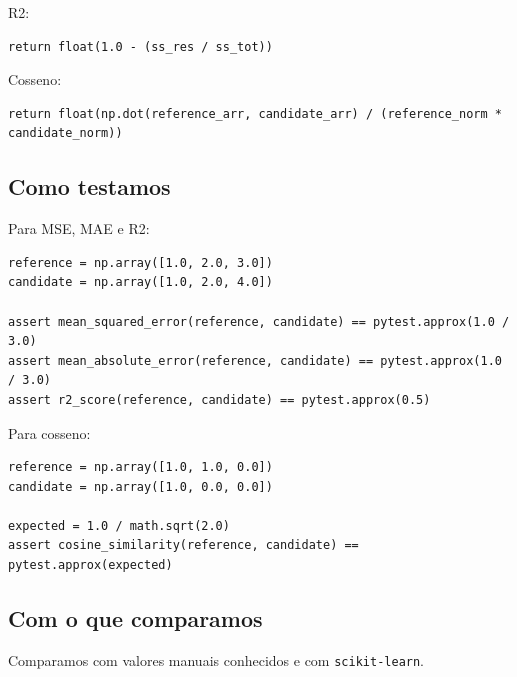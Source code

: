 R2:



\begin{Verbatim}[fontsize=\small,breaklines=true,label=python]
return float(1.0 - (ss_res / ss_tot))
\end{Verbatim}



Cosseno:



\begin{Verbatim}[fontsize=\small,breaklines=true,label=python]
return float(np.dot(reference_arr, candidate_arr) / (reference_norm * candidate_norm))
\end{Verbatim}



\subsection{Como testamos}



Para MSE, MAE e R2:



\begin{Verbatim}[fontsize=\small,breaklines=true,label=python]
reference = np.array([1.0, 2.0, 3.0])
candidate = np.array([1.0, 2.0, 4.0])

assert mean_squared_error(reference, candidate) == pytest.approx(1.0 / 3.0)
assert mean_absolute_error(reference, candidate) == pytest.approx(1.0 / 3.0)
assert r2_score(reference, candidate) == pytest.approx(0.5)
\end{Verbatim}



Para cosseno:



\begin{Verbatim}[fontsize=\small,breaklines=true,label=python]
reference = np.array([1.0, 1.0, 0.0])
candidate = np.array([1.0, 0.0, 0.0])

expected = 1.0 / math.sqrt(2.0)
assert cosine_similarity(reference, candidate) == pytest.approx(expected)
\end{Verbatim}



\subsection{Com o que comparamos}



Comparamos com valores manuais conhecidos e com \texttt{scikit-learn}.



